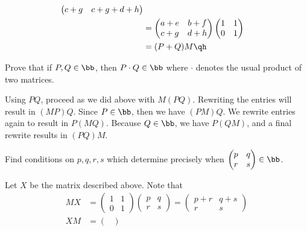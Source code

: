 \begin{problems}
\begin{sol}
\begin{align*}
\begin{pmatrix}
                c + g & c + g + d + h
            \end{pmatrix} \\
            & = 
            \begin{pmatrix}
                a + e & b + f \\
                c + g & d + h
            \end{pmatrix}
            \begin{pmatrix}
                1 & 1 \\
                0 & 1
            \end{pmatrix} \\
            & = (P + Q)M \qh
        \end{align*}
    \end{sol}
    \item Prove that if $P, Q \in \bb$, then $P\cdot Q \in \bb$ where $\cdot$ denotes the usual product of two matrices.
    \begin{sol}
        Using $PQ$, proceed as we did above with $M(PQ)$. Rewriting the entries will result in $(MP)Q$. Since $P \in \bb$, then we have $(PM)Q$. We rewrite entries again to result in $P(MQ)$. Because $Q \in \bb$, we have $P(QM)$, and a final rewrite results in $(PQ)M$.
    \end{sol}
    \item Find conditions on $p, q, r, s$ which determine precisely when $
    \begin{pmatrix}
        p & q \\
        r & s
    \end{pmatrix} \in \bb$.
    \begin{sol}
        Let $X$ be the matrix described above. Note that
        \begin{align*}
            MX & =
            \begin{pmatrix}
                1 & 1 \\
                0 & 1
            \end{pmatrix}
            \begin{pmatrix}
                p & q \\
                r & s
            \end{pmatrix} =
            \begin{pmatrix}
                p + r & q + s \\
                r & s
            \end{pmatrix} \\
            XM & = 
            \begin{pmatrix}

\end{pmatrix}
\end{align*}
\end{sol}
\end{problems}
